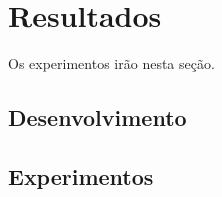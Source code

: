 \chapter{Resultados}\label{chap:Results}

Os experimentos irão nesta seção.


\section{Desenvolvimento} \label{sec:dev}


\section{Experimentos} \label{sec:exp}



